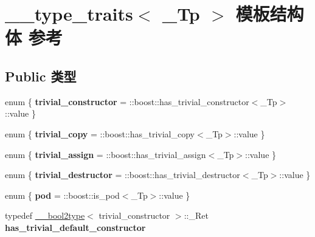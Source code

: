 \hypertarget{struct____type__traits}{}\section{\+\_\+\+\_\+type\+\_\+traits$<$ \+\_\+\+Tp $>$ 模板结构体 参考}
\label{struct____type__traits}
\subsection*{Public 类型}
\begin{DoxyCompactItemize}
\item 
\mbox{\label{struct____type__traits_ae1ae69b6ba1e83d944f0b0c8444f9ee9}} 
enum \{ {\bfseries trivial\+\_\+constructor} = \+:\+:boost\+:\+:has\+\_\+trivial\+\_\+constructor$<$\+\_\+\+Tp$>$\+:\+:value
 \}
\item 
\mbox{\label{struct____type__traits_a69e653401a0fc467c01bd18c1bac77cd}} 
enum \{ {\bfseries trivial\+\_\+copy} = \+:\+:boost\+:\+:has\+\_\+trivial\+\_\+copy$<$\+\_\+\+Tp$>$\+:\+:value
 \}
\item 
\mbox{\label{struct____type__traits_afdd3af05353479e66fd306cd89b4c02d}} 
enum \{ {\bfseries trivial\+\_\+assign} = \+:\+:boost\+:\+:has\+\_\+trivial\+\_\+assign$<$\+\_\+\+Tp$>$\+:\+:value
 \}
\item 
\mbox{\label{struct____type__traits_a65ccb1327c065cc6c001bfd7a82414bc}} 
enum \{ {\bfseries trivial\+\_\+destructor} = \+:\+:boost\+:\+:has\+\_\+trivial\+\_\+destructor$<$\+\_\+\+Tp$>$\+:\+:value
 \}
\item 
\mbox{\label{struct____type__traits_af703654a2a35df284b2a908e5e3bbf3f}} 
enum \{ {\bfseries pod} = \+:\+:boost\+:\+:is\+\_\+pod$<$\+\_\+\+Tp$>$\+:\+:value
 \}
\item 
\mbox{\label{struct____type__traits_aa82231225044be30caeac6e5d42bf16d}} 
typedef \hyperlink{struct____bool2type}{\+\_\+\+\_\+bool2type}$<$ trivial\+\_\+constructor $>$\+::\+\_\+\+Ret {\bfseries has\+\_\+trivial\+\_\+default\+\_\+constructor}
\item 
\mbox{\label{struct____type__traits_abe0bddbae25a281851605c397337407f}} 

\end{DoxyCompactItemize}
